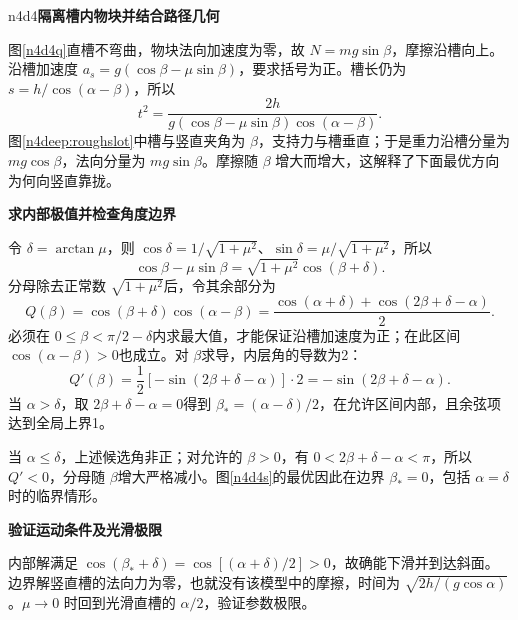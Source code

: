 \begin{drillsolution}{n4d4}\textbf{隔离槽内物块并结合路径几何}\par\nobreak
图\ref{n4d4q}直槽不弯曲，物块法向加速度为零，故 $N=mg\sin\beta$，摩擦沿槽向上。沿槽加速度 $a_s=g(\cos\beta-\mu\sin\beta)$，要求括号为正。槽长仍为 $s=h/\cos(\alpha-\beta)$，所以
\[t^2=\frac{2h}{g(\cos\beta-\mu\sin\beta)\cos(\alpha-\beta)}.\]
图\ref{n4deep:roughslot}中槽与竖直夹角为 $\beta$，支持力与槽垂直；于是重力沿槽分量为 $mg\cos\beta$，法向分量为 $mg\sin\beta$。摩擦随 $\beta$ 增大而增大，这解释了下面最优方向为何向竖直靠拢。




\par\medskip{}\noindent\textbf{求内部极值并检查角度边界}\par\nobreak
令 $\delta=\arctan\mu$，则 $\cos\delta=1/\sqrt{1+\mu^2}$、$\sin\delta=\mu/\sqrt{1+\mu^2}$，所以
\[
 \cos\beta-\mu\sin\beta
 =\sqrt{1+\mu^2}\cos(\beta+\delta).
\]
分母除去正常数 $\sqrt{1+\mu^2}$后，令其余部分为
\[
 Q(\beta)=\cos(\beta+\delta)\cos(\alpha-\beta)
 =\frac{\cos(\alpha+\delta)+\cos(2\beta+\delta-\alpha)}2.
\]
必须在 $0\le\beta<\pi/2-\delta$内求最大值，才能保证沿槽加速度为正；在此区间 $\cos(\alpha-\beta)>0$也成立。对 $\beta$求导，内层角的导数为2：
\[
 Q'(\beta)=\frac12[-\sin(2\beta+\delta-\alpha)]\cdot2
 =-\sin(2\beta+\delta-\alpha).
\]
当 $\alpha>\delta$，取 $2\beta+\delta-\alpha=0$得到 $\beta_*=(\alpha-\delta)/2$，在允许区间内部，且余弦项达到全局上界1。

当 $\alpha\le\delta$，上述候选角非正；对允许的 $\beta>0$，有 $0<2\beta+\delta-\alpha<\pi$，所以 $Q'<0$，分母随 $\beta$增大严格减小。图\ref{n4d4s}的最优因此在边界 $\beta_*=0$，包括 $\alpha=\delta$时的临界情形。



\par\medskip{}\noindent\textbf{验证运动条件及光滑极限}\par\nobreak
内部解满足 $\cos(\beta_*+\delta)=\cos[(\alpha+\delta)/2]>0$，故确能下滑并到达斜面。边界解竖直槽的法向力为零，也就没有该模型中的摩擦，时间为 $\sqrt{2h/(g\cos\alpha)}$。$\mu\to0$ 时回到光滑直槽的 $\alpha/2$，验证参数极限。
\end{drillsolution}
